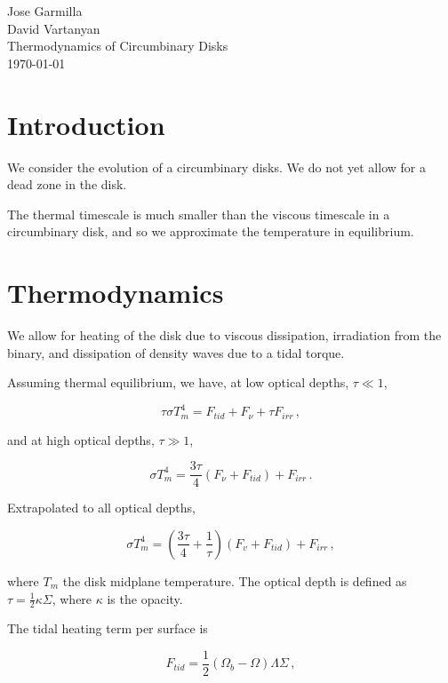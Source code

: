 \documentclass{article}
\begin{document}
\begin{flushleft}
Jose Garmilla \\
David Vartanyan\\
Thermodynamics of Circumbinary Disks\\
\today\\
\end{flushleft}

\section{Introduction}
We consider the evolution of a circumbinary disks. We do not yet allow for a dead zone in the disk.

The thermal timescale is much smaller than the viscous timescale in a circumbinary disk, and so we approximate the temperature in equilibrium.

\section{Thermodynamics}
We allow for heating of the disk due to viscous dissipation, irradiation from the binary, and dissipation of density waves due to a tidal torque.

Assuming thermal equilibrium, we have, at low optical depths, $\tau \ll 1$,

\begin{equation}
\tau \sigma T_m^4 = F_{tid} + F_{\nu} + \tau F_{irr}\,,
\end{equation}

and at high optical depths, $\tau \gg 1$,

\begin{equation}
\sigma T_m^4 = \frac{3\tau}{4} \left(F_\nu + F_{tid}\right) + F_{irr}\,.
\end{equation}

Extrapolated to all optical depths,

\begin{equation} \label{eq:encon}
\sigma T_m^4= \left(\frac{3\tau}{4} + \frac{1}{\tau}\right) \left(F_{v} + F_{tid}\right) + F_{irr}\,,
\end{equation}

where $T_m$ the disk midplane temperature. The optical depth is defined as $\tau =\frac{1}{2} \kappa \Sigma$, where $\kappa$ is the opacity.

The tidal heating term per surface is

\begin{equation}
F_{tid} = \frac{1}{2}\left(\Omega_b - \Omega\right) \Lambda \Sigma\,,
\end{equation}
\end{document}
